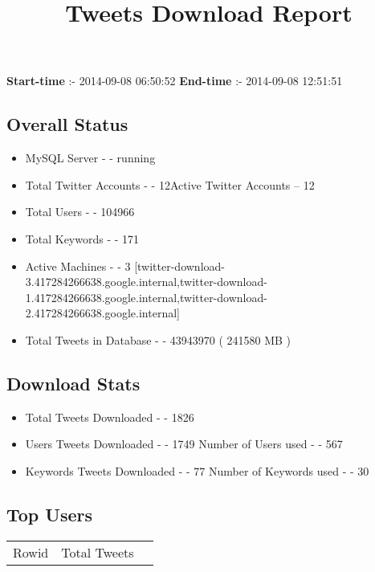 \documentclass{article}\usepackage[T1]{fontenc}
\begin{document}
\title{\textbf{Tweets Download Report}}
               \date{}
                \maketitle
               \centerline{\textbf{Start-time} :- 2014-09-08 06:50:52 \hspace{40pt} \textbf{End-time} :- 2014-09-08 12:51:51}               \subsection*{Overall Status}                \begin{itemize}                \item MySQL Server - - running               \item Total Twitter Accounts - - 12\newline Active Twitter Accounts -- 12               \item Total Users - - 104966               \item Total Keywords - - 171               \item Active Machines - - 3 [twitter-download-3.417284266638.google.internal,twitter-download-1.417284266638.google.internal,twitter-download-2.417284266638.google.internal]               \item Total Tweets in Database - - 43943970 ( 241580 MB )               \end{itemize}               \subsection*{Download Stats}                \begin{itemize}                \item Total Tweets Downloaded - - 1826               \item Users Tweets Downloaded - - 1749 \newline Number of Users used - - 567               \item Keywords Tweets Downloaded - - 77 \newline Number of Keywords used - - 30              \end{itemize}              \subsection*{Top Users}\begin{tabular}{|c|c|c|}         \hline         Rowid & Total Tweets \\ 

\end{tabular}
\end{document}
